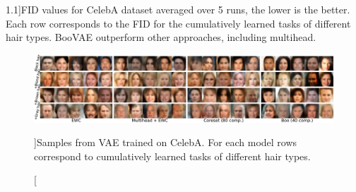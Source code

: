 \begin{table}[t]
\caption[][1.1\baselineskip]{FID values for CelebA dataset averaged over 5 runs, the lower is the better. Each row corresponds to the FID for the cumulatively learned tasks of different hair types. BooVAE outperform other approaches, including multihead.}
\label{tab:celeba_fid}
\begin{center}
    \vspace*{10pt}
\end{center}
\end{table}

\begin{figure}[t]
	     \vspace*{10pt}
		\centering
		\includegraphics[width=1.\textwidth]{pics/1_boovae/CELEBAGEN.pdf}
	\caption[][\baselineskip]{Samples from VAE trained on CelebA. For each model rows correspond to cumulatively learned tasks of different hair types.}
	\label{fig:CELEBAGEN}
	\vskip -5pt
\end{figure}
